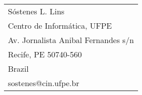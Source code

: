 

%
%

%


\vspace{5mm}
\begin{center}
\hspace{7mm}
\begin{tabular}{l}
   S\'ostenes L. Lins\\
   Centro de Inform\'atica, UFPE \\
   Av. Jornalista Anibal Fernandes s/n\\
   Recife, PE 50740-560 \\
   Brazil\\
   sostenes@cin.ufpe.br
\end{tabular}


\end{center}
